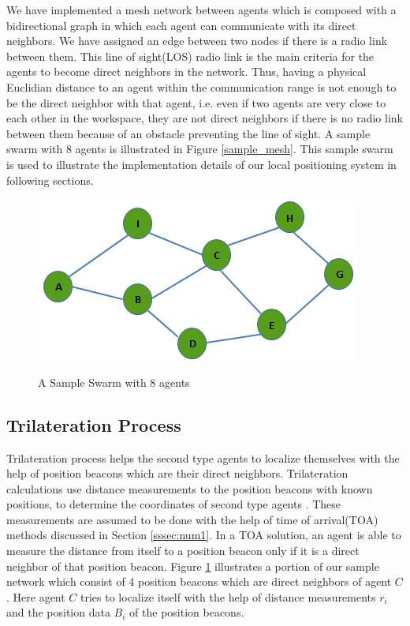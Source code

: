 We have implemented a mesh network between agents which is composed with a bidirectional graph in which each agent can communicate with its direct neighbors. We have assigned an edge between two nodes if there is a radio link between them. This line of sight(LOS) radio link is the main criteria for the agents to become direct neighbors in the network. Thus, having a physical Euclidian distance to an agent within the communication range is not enough to be the direct neighbor with that agent, i.e. even if two agents are very close to each other in the workspace, they are not direct neighbors if there is no radio link between them because of an obstacle preventing the line of sight. A sample swarm with 8 agents is illustrated in Figure \ref{sample_mesh}. This sample swarm is used to illustrate the implementation details of our local positioning system in following sections.

\begin{figure}[H] 
\caption{A Sample Swarm with 8 agents} \label{sample_mesh}
\centering
\includegraphics[scale = 0.65]{mesh}
\label{beacons_ref}
\end{figure}

\subsection{Trilateration Process}
Trilateration process helps the second type agents to localize themselves with the help of position beacons which are their direct neighbors.  Trilateration calculations use distance measurements to the position beacons with known positions, to determine the coordinates of second type agents \cite{22}. These measurements are assumed to be done with the help of time of arrival(TOA) methods discussed in Section \ref{sssec:num1}. In a TOA solution, an agent is able to measure the distance from itself to a position beacon only if it is a direct neighbor of that position beacon. Figure \ref{beacons_ref} illustrates a portion of our sample network which consist of 4 position beacons which are direct neighbors of agent $C$ . Here agent $C$ tries to localize itself with the help of distance measurements $r_i$ and the position data $B_i$ of the position beacons.

